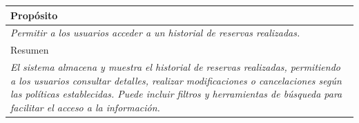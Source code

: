 \begin{table}[H]
\begin{tabular}{|llllllll|}
    \multicolumn{8}{|l|}{\cellcolor[HTML]{F2F2F2}Propósito}                                                                                                                                                                                                                                                                                       \\ \hline
    \multicolumn{8}{|p{15cm}|}{{\color[HTML]{808080} \textit{Permitir a los usuarios acceder a un historial de reservas realizadas.}}}                                                                                                                                                                                                                  \\ \hline
    \multicolumn{8}{|l|}{\cellcolor[HTML]{F2F2F2}Resumen}                                                                                                                                                                                                                                                                                         \\ \hline
    \multicolumn{8}{|p{15cm}|}{{\color[HTML]{999999} \textit{El sistema almacena y muestra el historial de reservas realizadas, permitiendo a los usuarios consultar detalles, realizar modificaciones o cancelaciones según las políticas establecidas. Puede incluir filtros y herramientas de búsqueda para facilitar el acceso a la información.}}} \\ \hline
    \end{tabular}
    \end{table}

